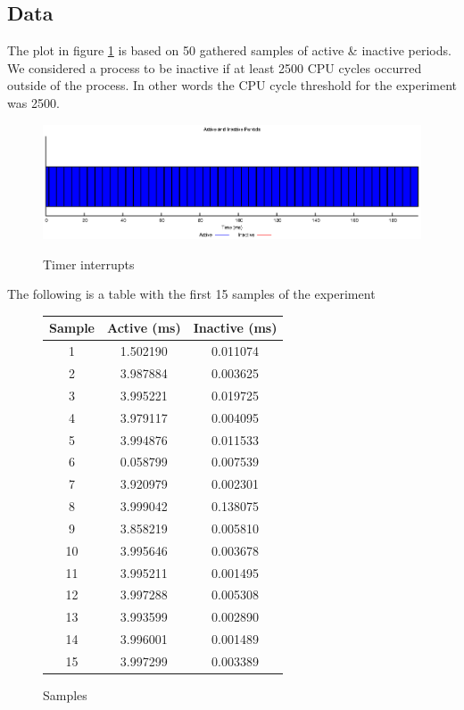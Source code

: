 \documentclass[oneside]{amsart}
\theoremstyle{definition}
\theoremstyle{remark}
\numberwithin{equation}{section}
\begin{document}
\subsection{Data}
The plot in figure \ref{fig:plot} is based on 50 gathered samples of active \& inactive periods. We
considered a process to be inactive if at least 2500 CPU cycles occurred outside of the process. In
other words the CPU cycle threshold for the experiment was 2500.

\begin{figure}[h]
    \caption{Timer interrupts}
    \centering
    \includegraphics[scale=1]{A1P1.eps}
    \label{fig:plot}
\end{figure}

\newpage

The following is a table with the first 15 samples of the experiment

\begin{figure}[h]
    \caption{Samples}
    \begin{tabular}{c|c|c}
        \rowcolor{gray!50}
        Sample & Active (ms) & Inactive (ms) \\
        \hline
        1  & 1.502190 & 0.011074 \\
        2  & 3.987884 & 0.003625 \\
        3  & 3.995221 & 0.019725 \\
        4  & 3.979117 & 0.004095 \\
        5  & 3.994876 & 0.011533 \\
        6  & 0.058799 & 0.007539 \\
        7  & 3.920979 & 0.002301 \\
        8  & 3.999042 & 0.138075 \\
        9  & 3.858219 & 0.005810 \\
        10 & 3.995646 & 0.003678 \\
        11 & 3.995211 & 0.001495 \\
        12 & 3.997288 & 0.005308 \\
        13 & 3.993599 & 0.002890 \\
        14 & 3.996001 & 0.001489 \\
        15 & 3.997299 & 0.003389
    \end{tabular}
    \label{fig:samples}
\end{figure}
\end{document}
